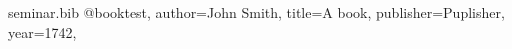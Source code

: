 \RequirePackage{filecontents}
\begin{filecontents*}{seminar.bib}
@book{test,
author={John Smith},
title={A book},
publisher={Puplisher},
year={1742},
}
\end{filecontents*}
\documentclass{beamer}
\usepackage{graphicx}

\usepackage{latexsym}		%
\usepackage{epsfig}		%
\usepackage{rotating}		%
\usepackage{eufrak}
\usepackage{natbib}
\def\newblock{\hskip .11em plus .33em minus .07em}





%
%


{
  \usetheme{Madrid}

  \setbeamercovered{transparent}
}


\usepackage[english]{babel}

\usepackage[latin1]{inputenc}

\usepackage{times}
\usepackage[T1]{fontenc}


%

\author[AMRUTHA K .V.] %
{AMRUTHA.K .V.}

